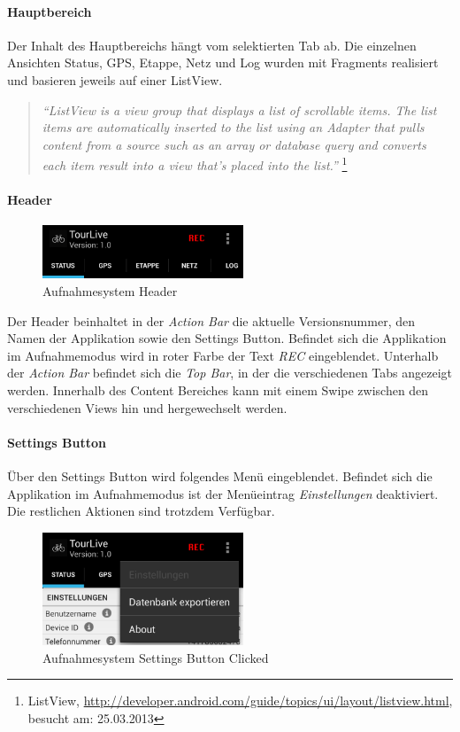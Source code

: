 \paragraph{Hauptbereich}
Der Inhalt des Hauptbereichs hängt vom selektierten Tab ab. Die einzelnen Ansichten Status, GPS, Etappe, Netz und Log wurden mit Fragments realisiert und basieren jeweils auf einer ListView.

\begin{quotation}
\textit{``ListView is a view group that displays a list of scrollable items. The list items are automatically inserted to the list using an Adapter that pulls content from a source such as an array or database query and converts each item result into a view that's placed into the list.''} \footnote{ListView, \url{http://developer.android.com/guide/topics/ui/layout/listview.html}, besucht am: 25.03.2013}
\end{quotation}

\paragraph{Header}
\begin{figure}[H]
	\centering
	\includegraphics[width=60mm]{images/android/header.png}
	\caption{Aufnahmesystem Header}
\end{figure}
Der Header beinhaltet in der \textit{Action Bar} die aktuelle Versionsnummer, den Namen der Applikation sowie den Settings Button. Befindet sich die Applikation im Aufnahmemodus wird in roter Farbe der Text \textit{REC} eingeblendet. Unterhalb der \textit{Action Bar} befindet sich die \textit{Top Bar}, in der die verschiedenen Tabs angezeigt werden. Innerhalb des Content Bereiches kann mit einem Swipe zwischen den verschiedenen Views  hin und hergewechselt werden.

\paragraph{Settings Button}
Über den Settings Button wird folgendes Menü eingeblendet. Befindet sich die Applikation im Aufnahmemodus ist der Menüeintrag \textit{Einstellungen} deaktiviert. Die restlichen Aktionen sind trotzdem Verfügbar.

\begin{figure}[H]
	\centering
	\includegraphics[width=60mm]{images/android/settingsclicked.png}
	\caption{Aufnahmesystem Settings Button Clicked}
\end{figure}




